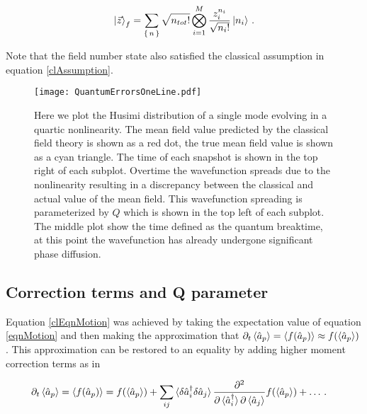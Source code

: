 \documentclass[aps,prd,twocolumn,superscriptaddress]{revtex4-1}
\begin{document}
\begin{align} \label{fieldNumState}
    \ket{\Vec{z}}_f = \sum_{\set{n}} \sqrt{n_{tot}!} \bigotimes_{i=1}^M \frac{ z_i^{n_i}}{\sqrt{n_i!}} \ket{n_i} \, .
\end{align}

Note that the field number state also satisfied the classical assumption in equation \ref{clAssumption}. 

\begin{widetext}

\begin{figure*}
	\texttt{[image: QuantumErrorsOneLine.pdf]}
	\caption{ Here we plot the Husimi distribution of a single mode evolving in a quartic nonlinearity. The mean field value predicted by the classical field theory is shown as a red dot, the true mean field value is shown as a cyan triangle. The time of each snapshot is shown in the top right of each subplot. Overtime the wavefunction spreads due to the nonlinearity resulting in a discrepancy between the classical and actual value of the mean field. This wavefunction spreading is parameterized by $Q$ which is shown in the top left of each subplot. The middle plot show the time defined as the quantum breaktime, at this point the wavefunction has already undergone significant phase diffusion. }
	\label{fig:qualConv}
\end{figure*}

\subsection{Correction terms and Q parameter}

Equation \eqref{clEqnMotion} was achieved by taking the expectation value of equation \eqref{eqnMotion} and then making the approximation that $\partial_t \braket{\hat a_p} = \braket{f(\hat a_p)} \approx f( \braket{\hat a_p} )$. This approximation can be restored to an equality by adding higher moment correction terms as in \cite{Eberhardt2021}

\begin{align} \label{series}
    \partial_t \braket{\hat a_p} &= \braket{f(\hat a_p)} = f( \braket{\hat a_p} ) + \sum_{ij} \braket{\delta \hat a_i^\dagger \delta \hat a_j} \frac{\partial^2}{\partial \braket{\hat a_i^\dagger} \partial \braket{\hat a_j}} f( \braket{\hat a_p} ) + \dots  \, .
\end{align}
\end{widetext}
\end{document}
